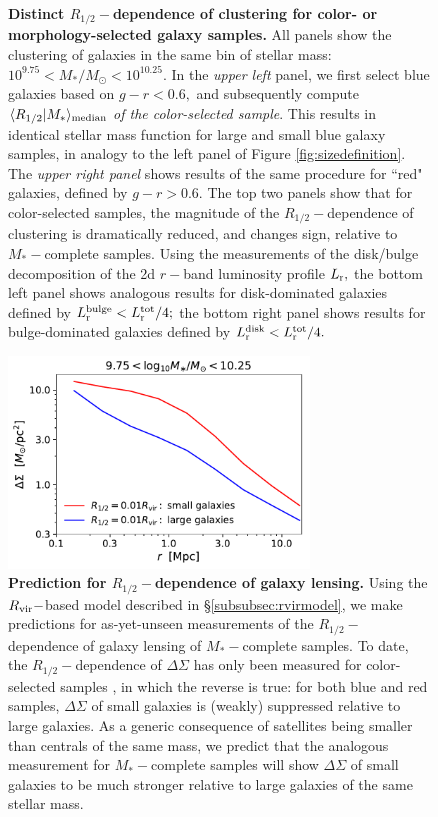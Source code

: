 \documentclass[usenatbib,usegraphicx,letterpaper]{mn2e}
\newcommand{\rhalf}{R_{1/2}}
\newcommand{\mstar}{M_{\ast}}
\newcommand{\rvir}{R_{\rm vir}}
\newcommand{\median}[2]{\langle{#1}\vert{#2}\rangle_{\rm median}}
\newcommand{\msun}{M_\odot}
\begin{document}
\begin{figure}
\caption{
{\bf Distinct $\rhalf-$dependence of clustering for color- or morphology-selected galaxy samples.}
All panels show the clustering of galaxies in the same bin of stellar mass: $10^{9.75}<\mstar/\msun<10^{10.25}.$ In the {\em upper left} panel, we first select blue galaxies based on $g-r<0.6,$ and subsequently compute $\median{\rhalf}{\mstar}$ {\em of the color-selected sample}. This results in identical stellar mass function for large and small blue galaxy samples, in analogy to the left panel of Figure \ref{fig:sizedefinition}. The {\em upper right panel} shows results of the same procedure for ``red" galaxies, defined by $g-r>0.6.$ The top two panels show that for color-selected samples, the magnitude of the $\rhalf-$dependence of clustering is dramatically reduced, and changes sign, relative to $\mstar-$complete samples. Using the \citet{meert_etal15} measurements of the disk/bulge decomposition of the 2d $r-$band luminosity profile $L_{\rm r},$ the bottom left panel shows analogous results for disk-dominated galaxies defined by $L_{\rm r}^{\rm bulge}<L_{\rm r}^{\rm tot}/4;$ the bottom right panel shows results for bulge-dominated galaxies defined by $L_{\rm r}^{\rm disk}<L_{\rm r}^{\rm tot}/4.$
}
\label{fig:strippingorphans}
\end{figure}

\begin{figure}
\centering
\includegraphics[width=8cm]{FIGS/rvir_only_lensing_prediction.pdf}
\caption{
{\bf Prediction for $\rhalf-$dependence of galaxy lensing.}
Using the $\rvir-$based model described in \S\ref{subsubsec:rvirmodel}, we make predictions for as-yet-unseen measurements of the $\rhalf-$dependence of galaxy lensing of $\mstar-$complete samples. To date, the $\rhalf-$dependence of $\Delta\Sigma$ has only been measured for color-selected samples \citep{charlton_etal17}, in which the reverse is true: for both blue and red samples, $\Delta\Sigma$ of small galaxies is (weakly) suppressed relative to large galaxies. As a generic consequence of satellites being smaller than centrals of the same mass, we predict that the analogous measurement for $\mstar-$complete samples will show $\Delta\Sigma$ of small galaxies to be much stronger relative to large galaxies of the same stellar mass.
}
\label{fig:strippingorphans}
\end{figure}
\end{document}
